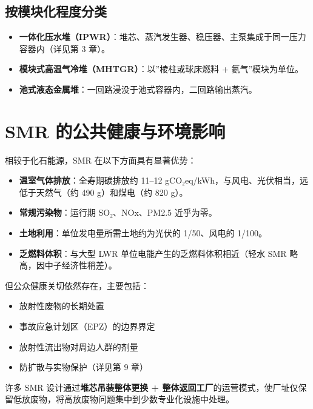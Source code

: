 \documentclass[
  UTF8,
  scheme=plain,
  fontsize=10pt,
  openany
]{ctexbook}
\begin{document}
\subsection{按模块化程度分类}\label{ux6309ux6a21ux5757ux5316ux7a0bux5ea6ux5206ux7c7b}

\begin{itemize}
\tightlist
\item
  \textbf{一体化压水堆（IPWR）}：堆芯、蒸汽发生器、稳压器、主泵集成于同一压力容器内（详见第
  3 章）。
\item
  \textbf{模块式高温气冷堆（MHTGR）}：以''棱柱或球床燃料 +
  氦气''模块为单位。
\item
  \textbf{池式液态金属堆}：一回路浸没于池式容器内，二回路输出蒸汽。
\end{itemize}

\section{SMR
的公共健康与环境影响}\label{smr-ux7684ux516cux5171ux5065ux5eb7ux4e0eux73afux5883ux5f71ux54cd}

相较于化石能源，SMR 在以下方面具有显著优势：

\begin{itemize}
\tightlist
\item
  \textbf{温室气体排放}：全寿期碳排放约 11--12
  gCO₂eq/kWh，与风电、光伏相当，远低于天然气（约 490 g）和煤电（约 820
  g）。
\item
  \textbf{常规污染物}：运行期 SO₂、NOx、PM2.5 近乎为零。
\item
  \textbf{土地利用}：单位发电量所需土地约为光伏的 1/50、风电的 1/100。
\item
  \textbf{乏燃料体积}：与大型 LWR 单位电能产生的乏燃料体积相近（轻水 SMR
  略高，因中子经济性稍差）。
\end{itemize}

但公众健康关切依然存在，主要包括：

\begin{itemize}
\tightlist
\item
  放射性废物的长期处置
\item
  事故应急计划区（EPZ）的边界界定
\item
  放射性流出物对周边人群的剂量
\item
  防扩散与实物保护（详见第 9 章）
\end{itemize}

许多 SMR 设计通过\textbf{堆芯吊装整体更换 +
整体返回工厂}的运营模式，使厂址仅保留低放废物，将高放废物问题集中到少数专业化设施中处理。
\end{document}
